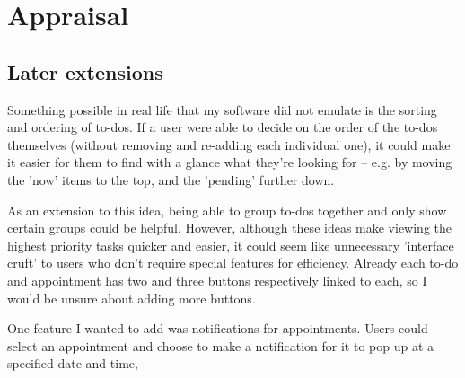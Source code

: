 \section{Appraisal}
\subsection{Later extensions}


Something possible in real life that my software did not emulate is the sorting
and ordering of to-dos. If a user were able to decide on the order of the to-dos
themselves (without removing and re-adding each individual one), it could make
it easier for them to find with a glance what they're looking for -- e.g. by
moving the 'now' items to the top, and the 'pending' further down.

As an extension to this idea, being able to group to-dos together and only show
certain groups could be helpful. However, although these ideas make viewing the
highest priority tasks quicker and easier, it could seem like unnecessary
'interface cruft' to users who don't require special features for efficiency.
Already each to-do and appointment has two and three buttons respectively linked
to each, so I would be unsure about adding more buttons.

One feature I wanted to add was notifications for appointments. Users could
select an appointment and choose to make a notification for it to pop up at a
specified date and time,
